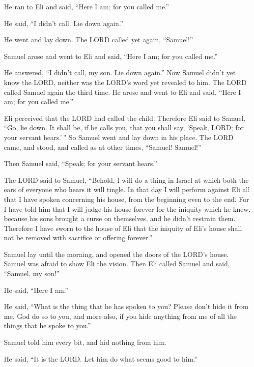  He ran to Eli and said, ``Here I am; for you called me.''

He said, ``I didn't call. Lie down again.''

He went and lay down.  The LORD called yet again,
``Samuel!''

Samuel arose and went to Eli and said, ``Here I am; for you called me.''

He answered, ``I didn't call, my son. Lie down again.''  Now
Samuel didn't yet know the LORD, neither was the LORD's word yet
revealed to him.  The LORD called Samuel again the third
time. He arose and went to Eli and said, ``Here I am; for you called
me.''

Eli perceived that the LORD had called the child.  Therefore
Eli said to Samuel, ``Go, lie down. It shall be, if he calls you, that
you shall say, `Speak, LORD; for your servant hears.'\,'' So Samuel went
and lay down in his place.  The LORD came, and stood, and
called as at other times, ``Samuel! Samuel!''

Then Samuel said, ``Speak; for your servant hears.''

 The LORD said to Samuel, ``Behold, I will do a thing in
Israel at which both the ears of everyone who hears it will tingle.
 In that day I will perform against Eli all that I have
spoken concerning his house, from the beginning even to the end.
 For I have told him that I will judge his house forever
for the iniquity which he knew, because his sons brought a curse on
themselves, and he didn't restrain them.  Therefore I have
sworn to the house of Eli that the iniquity of Eli's house shall not be
removed with sacrifice or offering forever.''

 Samuel lay until the morning, and opened the doors of the
LORD's house. Samuel was afraid to show Eli the vision. 
Then Eli called Samuel and said, ``Samuel, my son!''

He said, ``Here I am.''

 He said, ``What is the thing that he has spoken to you?
Please don't hide it from me. God do so to you, and more also, if you
hide anything from me of all the things that he spoke to you.''

 Samuel told him every bit, and hid nothing from him.

He said, ``It is the LORD. Let him do what seems good to him.''

